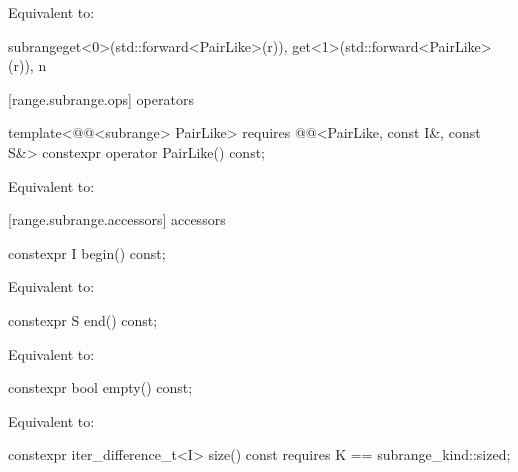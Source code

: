 \begin{addedblock}
\begin{itemdescr}
\pnum
\effects Equivalent to:
\begin{codeblock}
subrange{get<0>(std::forward<PairLike>(r)), get<1>(std::forward<PairLike>(r)), n}
\end{codeblock}
\end{itemdescr}

[range.subrange.ops]{ operators}

%
\begin{itemdecl}
template<@@<subrange> PairLike>
  requires @@<PairLike, const I&, const S&>
constexpr operator PairLike() const;
\end{itemdecl}

\begin{itemdescr}
\pnum
\effects Equivalent to: 
\end{itemdescr}

[range.subrange.accessors]{ accessors}

%
\begin{itemdecl}
constexpr I begin() const;
\end{itemdecl}

\begin{itemdescr}
\pnum
\effects Equivalent to: 
\end{itemdescr}

%
\begin{itemdecl}
constexpr S end() const;
\end{itemdecl}

\begin{itemdescr}
\pnum
\effects Equivalent to: 
\end{itemdescr}

%
\begin{itemdecl}
constexpr bool empty() const;
\end{itemdecl}

\begin{itemdescr}
\pnum
\effects Equivalent to: 
\end{itemdescr}

%
\begin{itemdecl}
constexpr iter_difference_t<I> size() const
  requires K == subrange_kind::sized;
\end{itemdecl}


\end{addedblock}
